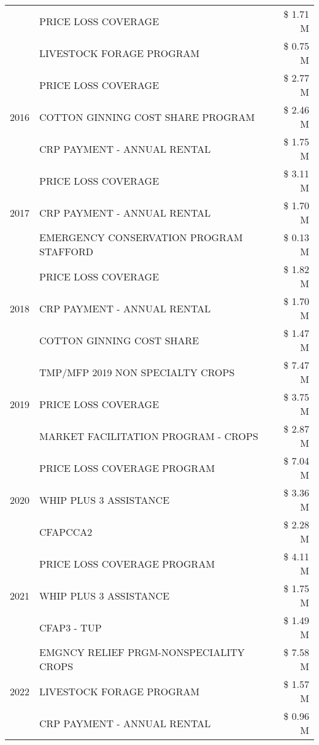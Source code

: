 \begin{tabular}{llr}
 & PRICE LOSS COVERAGE & \$ 1.71 M \\
 & LIVESTOCK FORAGE PROGRAM & \$ 0.75 M \\
\cline{1-3}
\multirow[t]{3}{*}{2016} & PRICE LOSS COVERAGE & \$ 2.77 M \\
 & COTTON GINNING COST SHARE PROGRAM & \$ 2.46 M \\
 & CRP PAYMENT - ANNUAL RENTAL & \$ 1.75 M \\
\cline{1-3}
\multirow[t]{3}{*}{2017} & PRICE LOSS COVERAGE & \$ 3.11 M \\
 & CRP PAYMENT - ANNUAL RENTAL & \$ 1.70 M \\
 & EMERGENCY CONSERVATION PROGRAM STAFFORD & \$ 0.13 M \\
\cline{1-3}
\multirow[t]{3}{*}{2018} & PRICE LOSS COVERAGE & \$ 1.82 M \\
 & CRP PAYMENT - ANNUAL RENTAL & \$ 1.70 M \\
 & COTTON GINNING COST SHARE & \$ 1.47 M \\
\cline{1-3}
\multirow[t]{3}{*}{2019} & TMP/MFP 2019 NON SPECIALTY CROPS & \$ 7.47 M \\
 & PRICE LOSS COVERAGE & \$ 3.75 M \\
 & MARKET FACILITATION PROGRAM - CROPS & \$ 2.87 M \\
\cline{1-3}
\multirow[t]{3}{*}{2020} & PRICE LOSS COVERAGE PROGRAM & \$ 7.04 M \\
 & WHIP PLUS 3 ASSISTANCE & \$ 3.36 M \\
 & CFAPCCA2 & \$ 2.28 M \\
\cline{1-3}
\multirow[t]{3}{*}{2021} & PRICE LOSS COVERAGE PROGRAM & \$ 4.11 M \\
 & WHIP PLUS 3 ASSISTANCE & \$ 1.75 M \\
 & CFAP3 - TUP & \$ 1.49 M \\
\cline{1-3}
\multirow[t]{3}{*}{2022} & EMGNCY RELIEF PRGM-NONSPECIALITY CROPS & \$ 7.58 M \\
 & LIVESTOCK FORAGE PROGRAM & \$ 1.57 M \\
 & CRP PAYMENT - ANNUAL RENTAL & \$ 0.96 M \\
\cline{1-3}
\bottomrule
\end{tabular}
